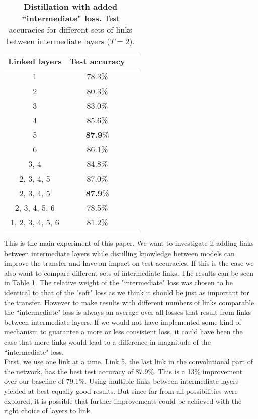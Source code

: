 \documentclass[10pt,twocolumn,letterpaper]{article}
\begin{document}
\begin{table}[]
	\begin{center}
	\begin{tabular}{|c|c|c|}
		\hline
		Linked layers		&	Test accuracy		\\ \hline
		1					&	78.3\%				\\ \hline
		2					&	80.3\%				\\ \hline
		3					&	83.0\%				\\ \hline
		4					&	85.6\%				\\ \hline
		5					&	\textbf{87.9}\%		\\ \hline
		6					&	86.1\%				\\ \hline %
		3, 4				&	84.8\%				\\ \hline
		2, 3, 4, 5			&	87.0\%				\\ \hline
		2, 3, 4, 5			&	\textbf{87.9}\%		\\ \hline
		2, 3, 4, 5, 6		&	78.5\%				\\ \hline
		1, 2, 3, 4, 5, 6	&	81.2\%				\\ \hline
	\end{tabular}
	\end{center}
	\caption{\textbf{Distillation with added ``intermediate" loss.} Test accuracies for different sets of links between intermediate layers ($T=2$).}
	\label{tab:interemediate_results}
\end{table}
This is the main experiment of this paper. We want to investigate if adding links between intermediate layers while distilling knowledge between models can improve the transfer and have an impact on test accuracies. If this is the case we also want to compare different sets of intermediate links. The results can be seen in Table \ref{tab:interemediate_results}. The relative weight of the "intermediate" loss was chosen to be identical to that of the "soft" loss as we think it should be just as important for the transfer. However to make results with different numbers of links comparable the ``intermediate" loss is always an average over all losses that result from links between intermediate layers. If we would not have implemented some kind of mechanism to guarantee a more or less consistent loss, it could have been the case that more links would lead to a difference in magnitude of the ``intermediate" loss.\\
First, we use one link at a time. Link 5, the last link in the convolutional part of the network, has the best test accuracy of 87.9\%. This is a 13\% improvement over our baseline of 79.1\%. Using multiple links between intermediate layers yielded at best equally good results. But since far from all possibilities were explored, it is possible that further improvements could be achieved with the right choice of layers to link.
\end{document}
